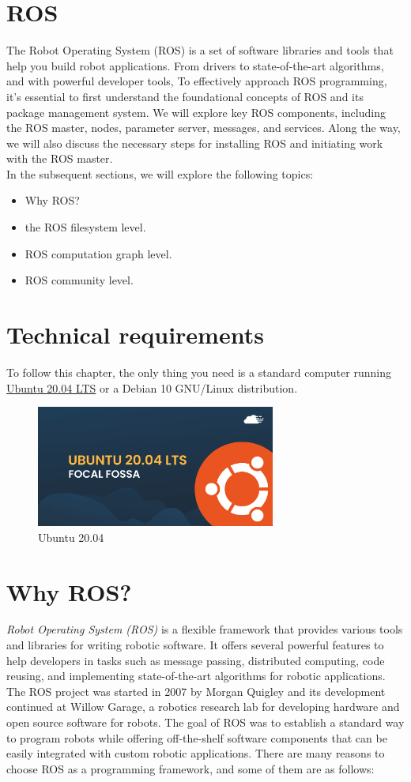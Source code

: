 \documentclass[../../main]{subfiles}
\begin{document}
\section{ROS}
The Robot Operating System (ROS) is a set of software libraries and tools that help you build robot applications. 
From drivers to state-of-the-art algorithms, and with powerful developer tools, \cite{ros_website}
To effectively approach ROS programming, it's essential to first understand the foundational concepts of ROS and its package management system. 
We will explore key ROS components, including the ROS master, nodes, parameter server, messages, and services. 
Along the way, we will also discuss the necessary steps for installing ROS and initiating work with the ROS master.\\
In the subsequent sections, we will explore the following topics:
\begin{itemize}
\item  Why ROS?
\item  the ROS filesystem level.
\item  ROS computation graph level.
\item  ROS community level.
\end{itemize}
\section*{Technical requirements}
To follow this chapter, the only thing you need is a 
standard computer running \href{https://releases.ubuntu.com/20.04/}{Ubuntu 20.04 LTS} or a Debian 10 GNU/Linux 
distribution.
\begin{figure}[h!]
    \centering
    \includegraphics[width=0.7\textwidth]{img/ubuntu.png}
    \caption{Ubuntu 20.04}
\end{figure}
\newpage
\section{Why ROS?}\cite{joseph2018mastering}
\emph{Robot Operating System (ROS)} is a flexible framework that provides various tools and
libraries for writing robotic software. It offers several powerful features to help developers
in tasks such as message passing, distributed computing, code reusing, and implementing
state-of-the-art algorithms for robotic applications. The ROS project was started in 2007
by Morgan Quigley and its development continued at Willow Garage, a robotics research
lab for developing hardware and open source software for robots. The goal of ROS was
to establish a standard way to program robots while offering off-the-shelf software
components that can be easily integrated with custom robotic applications. There are
many reasons to choose ROS as a programming framework, and some of them are as
follows:
\end{document}
